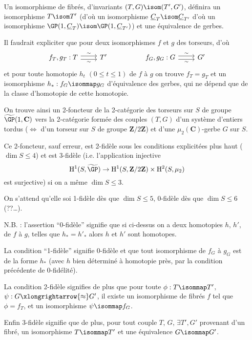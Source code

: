 Un isomorphisme de fibrés, d'invariants $(T, G) \isom (T', G')$, définira un isomorphisme $T \isom T'$ (d'où un isomorphisme $\underline{C}_T \isom \underline{C}_{T'}$ d'où un isomorphisme $\GP(1, \underline{C}_T) \isom \GP(1, \underline{C}_{T'})$) et une équivalence de gerbes.

Il faudrait expliciter que pour deux isomorphismes $f$ et $g$ des torseurs, d'où
\[\begin{tikzcd}
	{f_T, g_T: T} & {T'} && {f_G, g_G: G} & {G'}
	\arrow["\sim", shift left=1, from=1-1, to=1-2]
	\arrow["\sim"', shift right=1, from=1-1, to=1-2]
	\arrow["\sim", shift left=1, from=1-4, to=1-5]
	\arrow["\sim"', shift right=1, from=1-4, to=1-5]
\end{tikzcd}\]
et pour toute homotopie $h_t$ $(0 \leq t \leq 1)$ de $f$ à $g$ on trouve $f_T = g_T$ et un isomorphisme $h_*: f_G \isommap g_G$ d'équivalence des gerbes, qui ne dépend que de la classe d'homotopie de cette homotopie.

On trouve ainsi un 2-foncteur de la 2-catégorie des torseurs sur $S$ de groupe $\widetilde{\GP}(1, \mathbf{C})$ vers la 2-catégorie formée des couples $(T, G)$ d'un système d'entiers tordus ($\Leftrightarrow$ d'un torseur sur $S$ de groupe $\mathbf{Z}/2\mathbf{Z}$) et d'une $\mu_2(\mathbf{C})$-gerbe $G$ sur $S$.

Ce 2-foncteur, sauf erreur, est 2-fidèle sous les conditions explicitées plus haut ($\dim S \leq 4$) et est 3-fidèle (i.e. l'application injective
$$
\mathrm{H}^1(S, \widetilde{\GP}) \to \mathrm{H}^1(S, \mathbf{Z}/2\mathbf{Z}) \times \mathrm{H}^2(S, \mu_2)
$$
est surjective) si on a même $\dim S \leq 3$.

On s'attend qu'elle soi 1-fidèle dès que $\dim S \leq 5$, 0-fidèle dès que $\dim S \leq 6$ (??\dots).

N.B. : l'assertion ``0-fidèle'' signifie que si ci-dessus on a deux homotopies $h$, $h'$, de $f$ à $g$, telles que $h_* = h'_*$ alors $h$ et $h'$ sont homotopes.

La condition ``1-fidèle'' signifie 0-fidèle et que tout isomorphisme de $f_G$ à $g_G$ est de la forme $h_*$ (avec $h$ bien déterminé à homotopie près, par la condition précédente de 0-fidélité).

La condition 2-fidèle signifies de plus que pour toute $\phi: T \isommap T'$, $\psi: G \xlongrightarrow{\approx} G'$, il existe un isomorphisme de fibrés $f$ tel que $\phi = f_T$, et un isomorphisme $\psi \isommap f_G$.

Enfin 3-fidèle signifie que de plus, pour tout couple $T$, $G$, $\exists T', G'$ provenant d'un fibré, un isomorphisme $T \isommap T'$ et une équivalence $G \isommap G'$.

